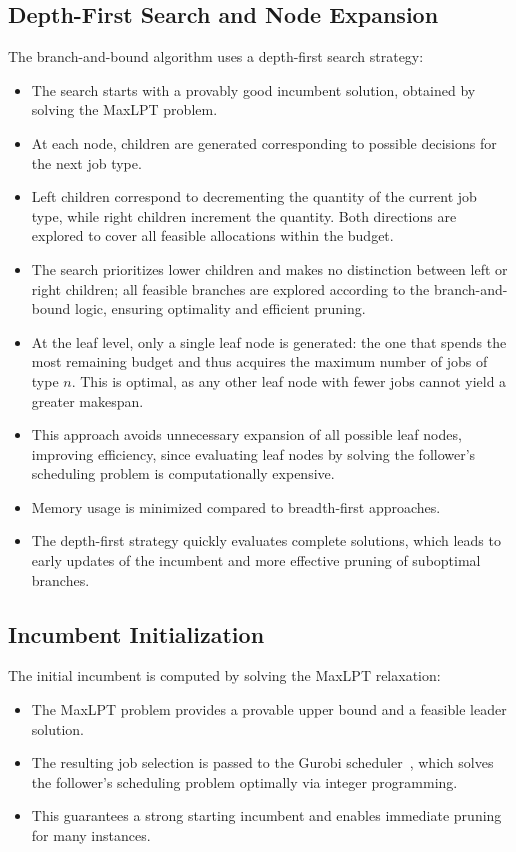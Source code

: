 \subsection{Depth-First Search and Node Expansion}

The branch-and-bound algorithm uses a depth-first search strategy:
\begin{itemize}
    \item The search starts with a provably good incumbent solution, obtained by solving the MaxLPT problem.
    \item At each node, children are generated corresponding to possible decisions for the next job type.
    \item Left children correspond to decrementing the quantity of the current job type, while right children increment the quantity. Both directions are explored to cover all feasible allocations within the budget.
    \item The search prioritizes lower children and makes no distinction between left or right children; all feasible branches are explored according to the branch-and-bound logic, ensuring optimality and efficient pruning.
    \item At the leaf level, only a single leaf node is generated: the one that spends the most remaining budget and thus acquires the maximum number of jobs of type $n$. This is optimal, as any other leaf node with fewer jobs cannot yield a greater makespan.
    \item This approach avoids unnecessary expansion of all possible leaf nodes, improving efficiency, since evaluating leaf nodes by solving the follower's scheduling problem is computationally expensive.
    \item Memory usage is minimized compared to breadth-first approaches.
    \item The depth-first strategy quickly evaluates complete solutions, which leads to early updates of the incumbent and more effective pruning of suboptimal branches.
\end{itemize}

\subsection{Incumbent Initialization}

The initial incumbent is computed by solving the MaxLPT relaxation:
\begin{itemize}
    \item The MaxLPT problem provides a provable upper bound and a feasible leader solution.
    \item The resulting job selection is passed to the Gurobi scheduler~\cite{gurobi}, which solves the follower's scheduling problem optimally via integer programming.
    \item This guarantees a strong starting incumbent and enables immediate pruning for many instances.
\end{itemize}

